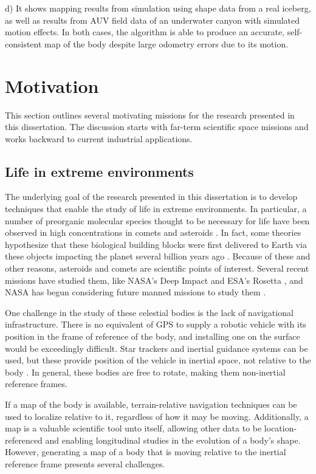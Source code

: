 d) It shows mapping results from simulation using shape data from a real iceberg, as well as results from AUV field data of an underwater canyon with simulated motion effects. In both cases, the algorithm is able to produce an accurate, self-consistent map of the body despite large odometry errors due to its motion.  



\section{Motivation}

This section outlines several motivating missions for the research presented in this dissertation. The discussion starts with far-term scientific space missions and works backward to current industrial applications.

\subsection{Life in extreme environments}

The underlying goal of the research presented in this dissertation is to develop techniques that enable the study of life in extreme environments. In particular, a number of preorganic molecular species thought to be necessary for life have been observed in high concentrations in comets and asteroids \cite{}. In fact, some theories hypothesize that these biological building blocks were first delivered to Earth via these objects impacting the planet several billion years ago \cite{}. Because of these and other reasons, asteroids and comets are scientific points of interest. Several recent missions have studied them, like NASA's Deep Impact \cite{} and ESA's Rosetta \cite{}, and NASA has begun considering future manned missions to study them \cite{}.

One challenge in the study of these celestial bodies is the lack of navigational infrastructure. There is no equivalent of GPS to supply a robotic vehicle with its position in the frame of reference of the body, and installing one on the surface would be exceedingly difficult. Star trackers and inertial guidance systems can be used, but these provide position of the vehicle in inertial space, not relative to the body \cite{}. In general, these bodies are free to rotate, making them non-inertial reference frames.

If a map of the body is available, terrain-relative navigation techniques can be used to localize relative to it, regardless of how it may be moving. Additionally, a map is a valuable scientific tool unto itself, allowing other data to be location-referenced and enabling longitudinal studies in the evolution of a body's shape. However, generating a map of a body that is moving relative to the inertial reference frame presents several challenges.

